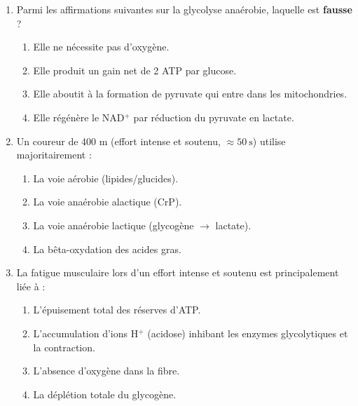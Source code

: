 \documentclass[11pt]{article}
\begin{document}
\begin{exercice}
\begin{enumerate}
    \item Parmi les affirmations suivantes sur la glycolyse anaérobie, laquelle est \textbf{fausse} ?
    \begin{enumerate}
        \item Elle ne nécessite pas d'oxygène.
        \item Elle produit un gain net de 2 ATP par glucose.
        \item Elle aboutit à la formation de pyruvate qui entre dans les mitochondries.
        \item Elle régénère le NAD$^+$ par réduction du pyruvate en lactate.
    \end{enumerate}
    \item Un coureur de 400 m (effort intense et soutenu, $\approx \SI{50}{\second}$) utilise majoritairement :
    \begin{enumerate}
        \item La voie aérobie (lipides/glucides).
        \item La voie anaérobie alactique (CrP).
        \item La voie anaérobie lactique (glycogène $\to$ lactate).
        \item La bêta-oxydation des acides gras.
    \end{enumerate}
    \item La fatigue musculaire lors d'un effort intense et soutenu est principalement liée à :
    \begin{enumerate}
        \item L'épuisement total des réserves d'ATP.
        \item L'accumulation d'ions H$^+$ (acidose) inhibant les enzymes glycolytiques et la contraction.
        \item L'absence d'oxygène dans la fibre.
        \item La déplétion totale du glycogène.
    \end{enumerate}
\end{enumerate}
\end{exercice}
\end{document}
